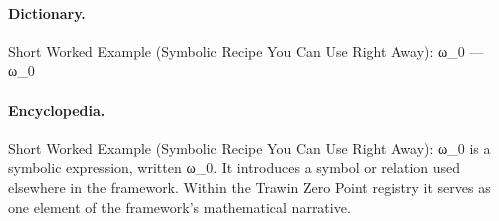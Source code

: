 \paragraph{Dictionary.}
Short Worked Example (Symbolic Recipe You Can Use Right Away): ω\_0 — ω\_0

\paragraph{Encyclopedia.}
Short Worked Example (Symbolic Recipe You Can Use Right Away): ω\_0 is a symbolic expression, written ω\_0. It introduces a symbol or relation used elsewhere in the framework. Within the Trawin Zero Point registry it serves as one element of the framework's mathematical narrative.
